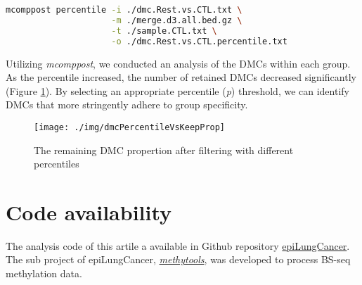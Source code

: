 \documentclass[10pt]{article}
\begin{document}
\begin{lstlisting}[language=sh, caption={}]
mcomppost percentile -i ./dmc.Rest.vs.CTL.txt \
                     -m ./merge.d3.all.bed.gz \
                     -t ./sample.CTL.txt \
                     -o ./dmc.Rest.vs.CTL.percentile.txt
\end{lstlisting}

Utilizing \emph{mcomppost}, we conducted an analysis of the DMCs within each group. As the percentile increased, the number of retained DMCs 
decreased significantly (Figure \ref*{fig:dmcPK}). By selecting an appropriate percentile (\textit{p}) threshold, we can identify DMCs that more stringently adhere to 
group specificity.


\begin{figure}[htbp]
    \centering
    \texttt{[image: ./img/dmcPercentileVsKeepProp]}
    \caption{The remaining DMC propertion after filtering with different percentiles}
    \label{fig:dmcPK}
\end{figure}

\section{Code availability}\label{sec:code}

The analysis code of this artile a available in Github repository \href{https://github.com/hcyvan/epiLungCancer}{epiLungCancer}. The
sub project of epiLungCancer, \href{https://github.com/hcyvan/epiLungCancer/tree/main/methytools}{\textit{methytools}},  was developed to process
BS-seq methylation data.





\end{document}
